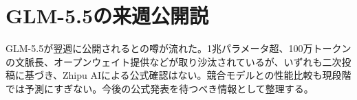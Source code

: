 \section{GLM-5.5の来週公開説}
GLM-5.5が翌週に公開されるとの噂が流れた。1兆パラメータ超、100万トークンの文脈長、オープンウェイト提供などが取り沙汰されているが、いずれも二次投稿に基づき、Zhipu AIによる公式確認はない。競合モデルとの性能比較も現段階では予測にすぎない。今後の公式発表を待つべき情報として整理する。
